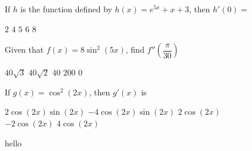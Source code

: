 \begin{questions}
    \question If $h$ is the function defined by $h(x) = e^{5x} + x + 3$, then $h'(0) = $ \\
    
    \begin{oneparchoices}
        \choice $2$
        \choice $4$
        \choice $5$
        \choice $6$
        \choice $8$
    \end{oneparchoices} \par \horizontalline

    \question Given that $f(x) = 8\sin^2 (5x)$, find $f''\left(\dfrac{\pi}{30}\right)$ \\

    \begin{oneparchoices}
        \choice $40\sqrt{3}$
        \choice $40\sqrt{2}$
        \choice $40$
        \choice $200$
        \choice $0$
    \end{oneparchoices} \par \horizontalline

    \question If $g(x) = \cos^2 (2x)$, then $g'(x)$ is \\

    \begin{oneparchoices}
        \choice $2\cos (2x)\sin (2x)$
        \choice $-4\cos (2x)\sin (2x)$
        \choice $2\cos (2x)$ \\[11pt]
        \makebox[0.25 \textwidth] \choice $-2\cos (2x)$ 
        \makebox[0.25 \textwidth] \choice $4\cos (2x)$
    \end{oneparchoices} \par \horizontalline

    \question hello
    
\end{questions}